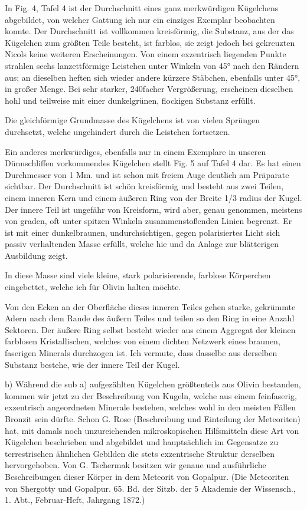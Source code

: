 \documentclass[a4paper, 11pt, oneside]{article}
\begin{document}
In Fig. 4, Tafel 4 ist der Durchschnitt eines ganz merkwürdigen Kügelchens abgebildet, von welcher Gattung ich nur ein einziges Exemplar beobachten konnte. Der Durchschnitt ist vollkommen kreisförmig, die Substanz, aus der das Kügelchen zum größten Teile besteht, ist farblos, sie zeigt jedoch bei gekreuzten Nicols keine weiteren Erscheinungen. Von einem exzentrisch liegenden Punkte strahlen sechs lanzettförmige Leistchen unter Winkeln von 45° nach den Rändern aus; an dieselben heften sich wieder andere kürzere Stäbchen, ebenfalls unter 45°, in großer Menge. Bei sehr starker, 240facher Vergrößerung, erscheinen dieselben hohl und teilweise mit einer dunkelgrünen, flockigen Substanz erfüllt.

Die gleichförmige Grundmasse des Kügelchens ist von vielen Sprüngen durchsetzt, welche ungehindert durch die Leistchen fortsetzen.

Ein anderes merkwürdiges, ebenfalls nur in einem Exemplare in unseren Dünnschliffen vorkommendes Kügelchen stellt Fig. 5 auf Tafel 4 dar. Es hat einen Durchmesser von 1 Mm. und ist schon mit freiem Auge deutlich am Präparate sichtbar. Der Durchschnitt ist schön kreisförmig und besteht aus zwei Teilen, einem inneren Kern und einem äußeren Ring von der Breite 1/3 radius der Kugel. Der innere Teil ist ungefähr von Kreisform, wird aber, genau genommen, meistens von graden, oft unter spitzen Winkeln zusammenstoßenden Linien begrenzt. Er ist mit einer dunkelbraunen, undurchsichtigen, gegen polarisiertes Licht sich passiv verhaltenden Masse erfüllt, welche hie und da Anlage zur blätterigen Ausbildung zeigt.

In diese Masse sind viele kleine, stark polarisierende, farblose Körperchen eingebettet, welche ich für Olivin halten möchte.

Von den Ecken an der Oberfläche dieses inneren Teiles gehen starke, gekrümmte Adern nach dem Rande des äußern Teiles und teilen so den Ring in eine Anzahl Sektoren. Der äußere Ring selbst besteht wieder aus einem Aggregat der kleinen farblosen Kristallischen, welches von einem dichten Netzwerk eines braunen, faserigen Minerals durchzogen ist. Ich vermute, dass dasselbe aus derselben Substanz bestehe, wie der innere Teil der Kugel.

b) Während die sub a) aufgezählten Kügelchen größtenteils aus Olivin bestanden, kommen wir jetzt zu der Beschreibung von Kugeln, welche aus einem feinfaserig, exzentrisch angeordneten Minerale bestehen, welches wohl in den meisten Fällen Bronzit sein dürfte. Schon G. Rose (Beschreibung und Einteilung der Meteoriten) hat, mit damals noch unzureichenden mikroskopischen Hilfsmitteln diese Art von Kügelchen beschrieben und abgebildet und hauptsächlich im Gegensatze zu terrestrischen ähnlichen Gebilden die stets exzentrische Struktur derselben hervorgehoben. Von G. Tschermak besitzen wir genaue und ausführliche Beschreibungen dieser Körper in dem Meteorit von Gopalpur. (Die Meteoriten von Shergotty und Gopalpur. 65. Bd. der Sitzb. der 5 Akademie der Wissensch., 1. Abt., Februar-Heft, Jahrgang 1872.)
\end{document}
